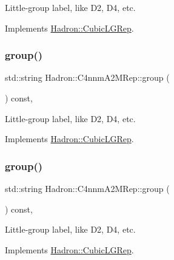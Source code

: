 Little-\/group label, like D2, D4, etc. 

Implements \mbox{\hyperlink{structHadron_1_1CubicLGRep_a9bdb14b519a611d21379ed96a3a9eb41}{Hadron\+::\+Cubic\+L\+G\+Rep}}.

\mbox{\label{structHadron_1_1C4nnmA2MRep_a469cdf0a49cdd54d88ab2786a8b25f13}} 
\subsubsection{\texorpdfstring{group()}{group()}\hspace{0.1cm}{\footnotesize\ttfamily [2/3]}}
{\footnotesize\ttfamily std\+::string Hadron\+::\+C4nnm\+A2\+M\+Rep\+::group (\begin{DoxyParamCaption}{ }\end{DoxyParamCaption}) const\hspace{0.3cm}{\ttfamily [inline]}, {\ttfamily [virtual]}}

Little-\/group label, like D2, D4, etc. 

Implements \mbox{\hyperlink{structHadron_1_1CubicLGRep_a9bdb14b519a611d21379ed96a3a9eb41}{Hadron\+::\+Cubic\+L\+G\+Rep}}.

\mbox{\label{structHadron_1_1C4nnmA2MRep_a469cdf0a49cdd54d88ab2786a8b25f13}} 
\subsubsection{\texorpdfstring{group()}{group()}\hspace{0.1cm}{\footnotesize\ttfamily [3/3]}}
{\footnotesize\ttfamily std\+::string Hadron\+::\+C4nnm\+A2\+M\+Rep\+::group (\begin{DoxyParamCaption}{ }\end{DoxyParamCaption}) const\hspace{0.3cm}{\ttfamily [inline]}, {\ttfamily [virtual]}}

Little-\/group label, like D2, D4, etc. 

Implements \mbox{\hyperlink{structHadron_1_1CubicLGRep_a9bdb14b519a611d21379ed96a3a9eb41}{Hadron\+::\+Cubic\+L\+G\+Rep}}.

\mbox{\label{structHadron_1_1C4nnmA2MRep_a08a21eab24db1e7b93cde52766cfee0b}} 
